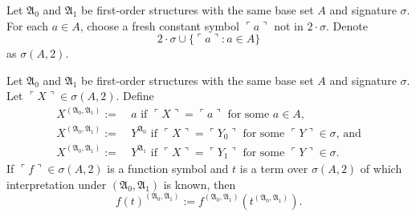 \documentclass[12pt]{article}
\numberwithin{equation}{section}
\begin{document}
\begin{defi}
Let $\mathfrak{A}_0$ and $\mathfrak{A}_1$ be first-order structures with the same base set $A$ and signature $\sigma$. For each $a \in A$, choose a fresh constant symbol $\ulcorner a \urcorner$ not in $2 \cdot \sigma$. Denote
\begin{equation*}
    2 \cdot \sigma \cup \{\ulcorner a \urcorner : a \in A\}
\end{equation*}
as $\sigma(A, 2)$.
\end{defi}

\begin{defi}
Let $\mathfrak{A}_0$ and $\mathfrak{A}_1$ be first-order structures with the same base set $A$ and signature $\sigma$. Let $\ulcorner X \urcorner \in \sigma(A, 2)$.
Define
\begin{align*}
    X^{(\mathfrak{A}_0, \mathfrak{A}_1)} := \ & a \text{ if } \ulcorner X \urcorner = \ulcorner a \urcorner \text{ for some } a \in A \text{,} \\
    X^{(\mathfrak{A}_0, \mathfrak{A}_1)} := \ & Y^{\mathfrak{A}_0} \text{ if } \ulcorner X \urcorner = \ulcorner Y_0 \urcorner \text{ for some } \ulcorner Y \urcorner \in \sigma \text{, and} \\
    X^{(\mathfrak{A}_0, \mathfrak{A}_1)} := \ & Y^{\mathfrak{A}_1} \text{ if } \ulcorner X \urcorner = \ulcorner Y_1 \urcorner \text{ for some } \ulcorner Y \urcorner \in \sigma \text{.}
\end{align*}
If $\ulcorner f \urcorner \in \sigma(A, 2)$ is a function symbol and $t$ is a term over $\sigma(A, 2)$ of which interpretation under $(\mathfrak{A}_0, \mathfrak{A}_1)$ is known, then 
\begin{equation*}
    f(t)^{(\mathfrak{A}_0, \mathfrak{A}_1)} := f^{(\mathfrak{A}_0, \mathfrak{A}_1)}(t^{(\mathfrak{A}_0, \mathfrak{A}_1)}) \text{.}
\end{equation*}
\end{defi}
\end{document}
